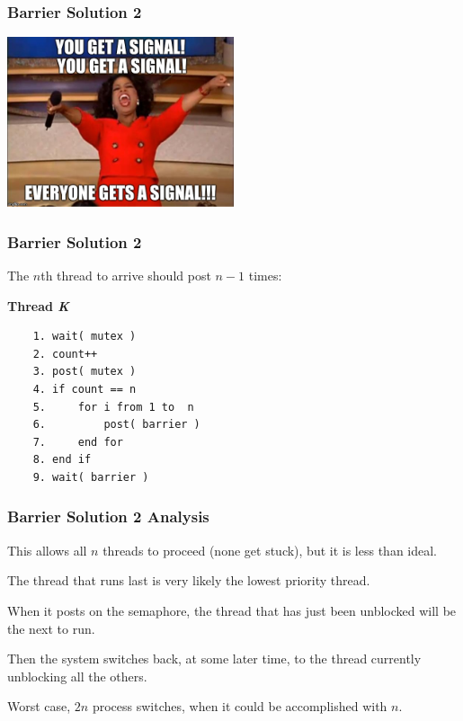 \begin{frame}
\frametitle{Barrier Solution 2}

\begin{center}
\includegraphics[width=0.5\textwidth]{images/oprah.jpg}
\end{center}


\end{frame}


\begin{frame}[fragile]
\frametitle{Barrier Solution 2}

The $n$th thread to arrive should post $n-1$ times:

\textbf{Thread \textit{K}}\vspace{-6em}
  \begin{verbatim}
	1. wait( mutex )
	2. count++
	3. post( mutex )
	4. if count == n
	5.     for i from 1 to  n
	6.         post( barrier )
	7.     end for
	8. end if
	9. wait( barrier )
  \end{verbatim}
\vspace{-2em} 




\end{frame}

\begin{frame}
\frametitle{Barrier Solution 2 Analysis}

This allows all $n$ threads to proceed (none get stuck), but it is less than ideal. 

The thread that runs last is very likely the lowest priority thread.

When it posts on the semaphore, the thread that has just been unblocked will be the next to run.

Then the system switches back, at some later time, to the thread currently unblocking all the others. 

Worst case, $2n$ process switches, when it could be accomplished with $n$.


\end{frame}

